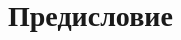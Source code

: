 \maketitle

\thispagestyle{mainpage}
\clearpage
\tableofcontents
\clearpage
\section*{Предисловие}


